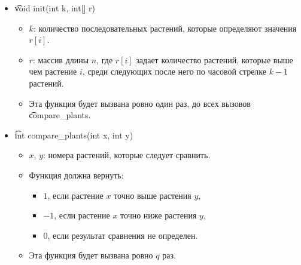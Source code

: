 \begin{itemize}
\item \t{void init(int k, int[] r)}
\begin{itemize}
\item $k$: количество последовательных растений, которые определяют значения $r[i]$.
\item $r$: массив длины $n$, где $r[i]$ задает количество растений, которые выше чем растение $i$, среди следующих после него по часовой стрелке $k-1$ растений.
\item Эта функция будет вызвана ровно один раз, до всех вызовов \t{compare\_plants}.
\end{itemize}

\item \t{int compare\_plants(int x, int y)}
\begin{itemize}
\item $x$, $y$: номера растений, которые следует сравнить.
\item Функция должна вернуть:
\begin{itemize}
  \item $1$, если растение $x$ точно выше растения $y$,
  \item $-1$, если растение $x$ точно ниже растения $y$,
  \item $0$, если результат сравнения не определен.
\end{itemize}
\item Эта функция будет вызвана ровно $q$ раз.
\end{itemize}
\end{itemize}



